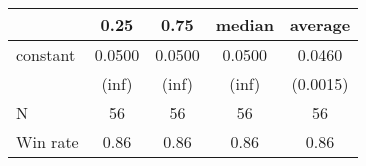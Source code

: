 \begin{tabular}{lcccc}
\hline
         &  0.25  &  0.75  & median & average   \\
\midrule
\midrule
constant & 0.0500 & 0.0500 & 0.0500 & 0.0460    \\
         & (inf)  & (inf)  & (inf)  & (0.0015)  \\
N        & 56     & 56     & 56     & 56        \\
Win rate & 0.86   & 0.86   & 0.86   & 0.86      \\
\hline
\end{tabular}